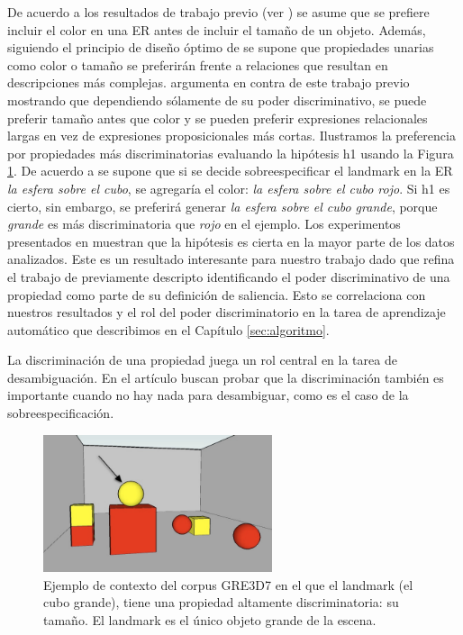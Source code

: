 De acuerdo a los resultados de trabajo previo (ver \cite{Pechmann1989}) se asume que se prefiere incluir el color en una ER antes de incluir el tama\~no de un objeto. 
Adem\'as, siguiendo el principio de dise\~no \'optimo de \cite{clark1992arenas} se supone que propiedades unarias como color o tama\~no se preferir\'an frente a relaciones que resultan en descripciones m\'as complejas. \cite{acl-Paraboni15} argumenta en contra de este trabajo previo mostrando que dependiendo s\'olamente de su poder discriminativo, se puede preferir tama\~no antes que color y se pueden preferir expresiones relacionales largas en vez de expresiones proposicionales m\'as cortas.
Ilustramos la preferencia por propiedades m\'as discriminatorias evaluando la hip\'otesis h1 usando la Figura \ref{fig-2-2}. De acuerdo a \cite{Pechmann1989} se supone que si se decide sobreespecificar el landmark en la ER \emph{la esfera sobre el cubo}, se agregar\'ia el color: \emph{la esfera sobre el cubo rojo}. Si h1 es cierto, sin embargo, se preferir\'a generar \emph{la esfera sobre el cubo grande}, porque \emph{grande} es m\'as discriminatoria que \emph{rojo} en el ejemplo. Los experimentos presentados en \cite{acl-Paraboni15} muestran que la hip\'otesis es cierta en la mayor parte de los datos analizados. Este es un resultado interesante para nuestro trabajo dado que refina el trabajo de \cite{keysar:Curr98} previamente descripto identificando el poder discriminativo de una propiedad como parte de su definici\'on de saliencia.
Esto se correlaciona con nuestros resultados y el rol del poder discriminatorio en la tarea de aprendizaje autom\'atico que describimos en el Cap\'itulo \ref{sec:algoritmo}.

La discriminaci\'on de una propiedad juega un rol central en la tarea de desambiguaci\'on. En el art\'iculo buscan probar que la discriminaci\'on tambi\'en es importante cuando no hay nada para desambiguar, como es el caso de la sobreespecificaci\'on.




\begin{figure}[ht]
\centering
\includegraphics[width=0.6\textwidth]{images/7.jpg}
\caption{Ejemplo de contexto del corpus GRE3D7 en el que el landmark (el cubo grande), tiene una propiedad altamente discriminatoria: su tama\~no. El landmark es el \'unico objeto grande de la escena.}
\label{fig-2-2}
\end{figure}



